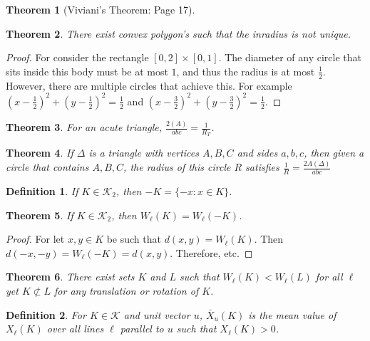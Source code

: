 \documentclass[oneside]{book}
\theoremstyle{mystyle}
\newtheorem{theorem}{Theorem}[section]
\newtheorem{definition}{Definition}[section]
\begin{document}
\begin{theorem}[Viviani's Theorem: Page 17]
\end{theorem}

\begin{theorem}
There exist convex polygon's such that the inradius is not unique.
\end{theorem}
\begin{proof}
For consider the rectangle $[0,2]\times [0,1]$. The diameter of any circle that sits inside this body must be at most $1$, and thus the radius is at most $\frac{1}{2}$. However, there are multiple circles that achieve this. For example $(x-\frac{1}{2})^2+(y-\frac{1}{2})^2=\frac{1}{2}$ and $(x-\frac{3}{2})^2+(y-\frac{3}{2})^2=\frac{1}{2}$.
\end{proof}

\begin{theorem}
For an acute triangle, $\frac{2(A)}{abc} = \frac{1}{R_T}$.
\end{theorem}

\begin{theorem}
If $\Delta$ is a triangle with vertices $A,B,C$ and sides $a,b,c$, then given a circle that contains $A,B,C$, the radius of this circle $R$ satisfies $\frac{1}{R} =\frac{2A(\Delta)}{abc}$
\end{theorem}

\begin{definition}
If $K\in \mathscr{K}_2$, then $-K = \{-x:x\in K\}$.
\end{definition}

\begin{theorem}
If $K\in \mathscr{K}_2$, then $W_{\ell}(K) = W_{\ell}(-K)$.
\end{theorem}
\begin{proof}
For let $x,y\in K$ be such that $d(x,y) = W_{\ell}(K)$. Then $d(-x,-y) = W_{\ell}(-K) = d(x,y)$. Therefore, etc.
\end{proof}

\begin{theorem}
There exist sets $K$ and $L$ such that $W_{\ell}(K)<W_{\ell}(L)$ for all $\ell$ yet $K\not\subset L$ for any translation or rotation of $K$.
\end{theorem}

\begin{definition}
For $K\in \mathscr{K}$ and unit vector $u$, $\bar{X}_{u}(K)$ is the mean value of $X_{\ell}(K)$ over all lines $\ell$ parallel to $u$ such that $X_{\ell}(K)>0$.
\end{definition}
\end{document}
